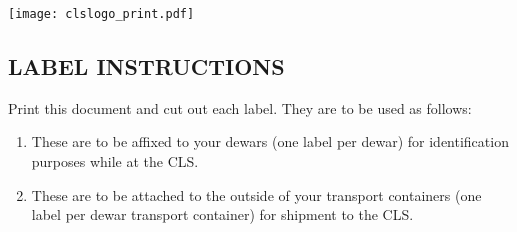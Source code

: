 \documentclass[a4paper,10pt]{report}
\begin{document}
\hspace{-0.25in}
\texttt{[image: clslogo\_print.pdf]}

\begin{center}

    \begin{minipage}{0.8\textwidth}
        \section*{LABEL INSTRUCTIONS}
        
        Print this document and cut out each label.  They are to be used as follows:

        \begin{enumerate}
        \item {\color{red}{\bf Identification Labels:}} These are to be affixed to your dewars (one label per dewar) for identification purposes while at the CLS.
        \item {\color{blue}{\bf Address Labels:}} These are to be attached to the outside of your transport containers (one label per dewar transport container) for shipment to the CLS.
        \end{enumerate}
    \end{minipage}

    \vspace{0.5in}


\end{center}
\end{document}
